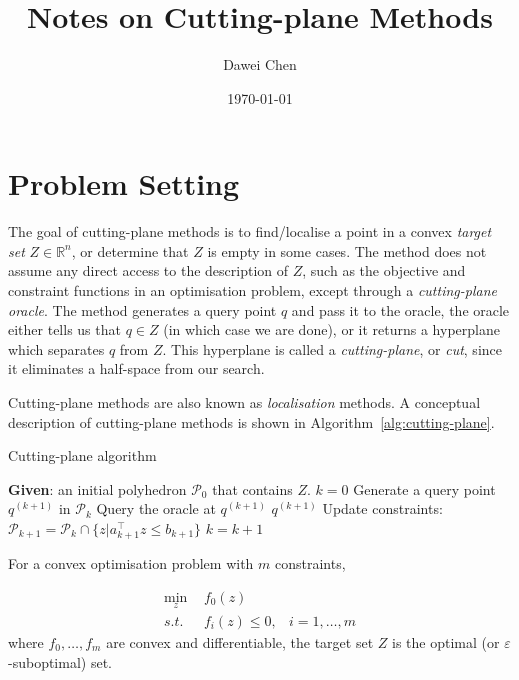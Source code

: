 \documentclass[9pt]{extarticle}
\title{Notes on Cutting-plane Methods}
\author{Dawei Chen}
\date{\today}
\begin{document}
\maketitle

\section{Problem Setting}
\label{sec:problem}

The goal of cutting-plane methods is to find/localise a point in a convex \textit{target set} $Z \in \mathbb{R}^n$,
or determine that $Z$ is empty in some cases. 
The method does not assume any direct access to the description of $Z$,
such as the objective and constraint functions in an optimisation problem, except through a \textit{cutting-plane oracle}.
The method generates a query point $q$ and pass it to the oracle, 
the oracle either tells us that $q \in Z$ (in which case we are done), or it returns a hyperplane which separates $q$ from $Z$.
This hyperplane is called a \textit{cutting-plane}, or \textit{cut}, since it eliminates a half-space from our search.

Cutting-plane methods are also known as \textit{localisation} methods. 
A conceptual description of cutting-plane methods is shown in Algorithm~\ref{alg:cutting-plane}.


\begin{algorithm}[htbp]
\caption{Cutting-plane algorithm}
\label{alg:cutting-plane}
\begin{algorithmic}[1]
\STATE \textbf{Given}: an initial polyhedron $\mathcal{P}_0$ that contains $Z$.
\STATE $k = 0$
\REPEAT
    \STATE Generate a query point $q^{(k+1)}$ in $\mathcal{P}_k$
    \STATE Query the oracle at $q^{(k+1)}$
        \RETURN $q^{(k+1)}$
        \STATE Update constraints: $\mathcal{P}_{k+1} = \mathcal{P}_k \cap \{z | a_{k+1}^\top z \le b_{k+1} \}$
    \ENDIF
    \STATE $k = k + 1$
\end{algorithmic}
\end{algorithm}


\noindent
For a convex optimisation problem with $m$ constraints,

\begin{equation}
\label{eq:cvxprob}
\begin{aligned}
\min_{z} ~& f_0(z)        & \\
s.t.~~   ~& f_i(z) \le 0, & i = 1, \dots, m
\end{aligned} 
\end{equation}
where $f_0, \dots, f_m$ are convex and differentiable, the target set $Z$ is the optimal (or $\varepsilon$-suboptimal) set.
\end{document}

